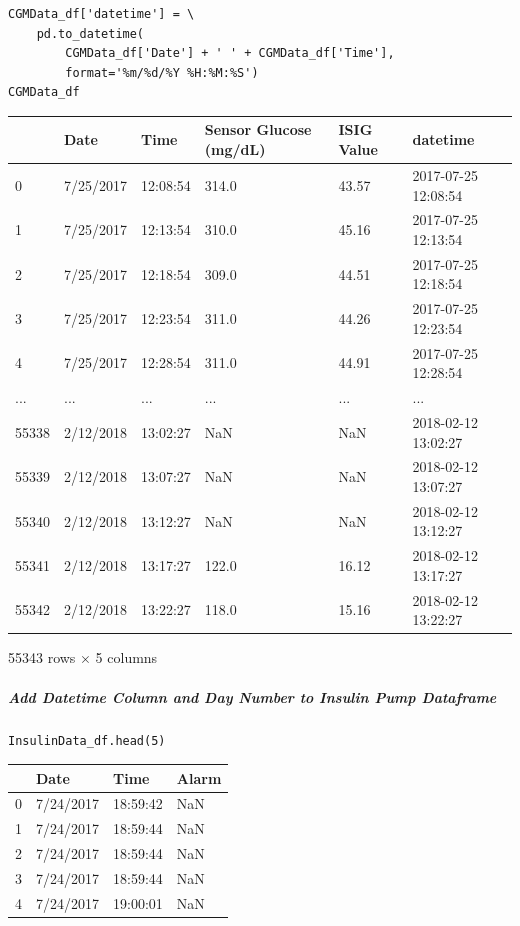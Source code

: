 \bigskip

\begin{verbatim}
CGMData_df['datetime'] = \
    pd.to_datetime(
        CGMData_df['Date'] + ' ' + CGMData_df['Time'], 
        format='%m/%d/%Y %H:%M:%S')
CGMData_df
\end{verbatim}

\bigskip\noindent
\begin{tabular}{p{}p{}p{}p{}p{}p{}}
\toprule
 & Date & Time & Sensor Glucose (mg/dL) & ISIG Value & datetime \\
\hline
0 & 7/25/2017 & 12:08:54 & 314.0 & 43.57 & 2017-07-25 12:08:54 \\
\hline
1 & 7/25/2017 & 12:13:54 & 310.0 & 45.16 & 2017-07-25 12:13:54 \\
\hline
2 & 7/25/2017 & 12:18:54 & 309.0 & 44.51 & 2017-07-25 12:18:54 \\
\hline
3 & 7/25/2017 & 12:23:54 & 311.0 & 44.26 & 2017-07-25 12:23:54 \\
\hline
4 & 7/25/2017 & 12:28:54 & 311.0 & 44.91 & 2017-07-25 12:28:54 \\
\hline
... & ... & ... & ... & ... & ... \\
\hline
55338 & 2/12/2018 & 13:02:27 & NaN & NaN & 2018-02-12 13:02:27 \\
\hline
55339 & 2/12/2018 & 13:07:27 & NaN & NaN & 2018-02-12 13:07:27 \\
\hline
55340 & 2/12/2018 & 13:12:27 & NaN & NaN & 2018-02-12 13:12:27 \\
\hline
55341 & 2/12/2018 & 13:17:27 & 122.0 & 16.12 & 2018-02-12 13:17:27 \\
\hline
55342 & 2/12/2018 & 13:22:27 & 118.0 & 15.16 & 2018-02-12 13:22:27 \\
\hline
\bottomrule
\end{tabular}

\bigskip

55343 rows $\times$ 5 columns

\subparagraph{Add Datetime Column and Day Number to Insulin Pump Dataframe}

\begin{verbatim}
InsulinData_df.head(5)
\end{verbatim}

\bigskip\noindent
\begin{tabular}{p{}p{}p{}p{}}
\toprule
 & Date & Time & Alarm \\
\hline
0 & 7/24/2017 & 18:59:42 & NaN \\
\hline
1 & 7/24/2017 & 18:59:44 & NaN \\
\hline
2 & 7/24/2017 & 18:59:44 & NaN \\
\hline
3 & 7/24/2017 & 18:59:44 & NaN \\
\hline
4 & 7/24/2017 & 19:00:01 & NaN \\
\hline
\bottomrule
\end{tabular}

